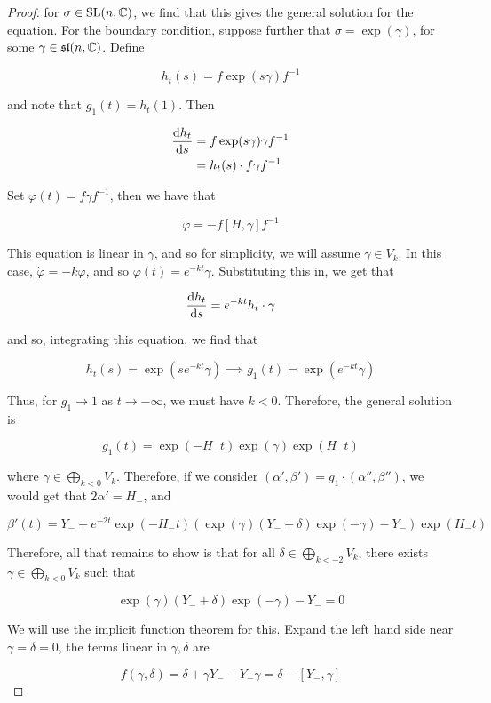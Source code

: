 \documentclass{article}
\renewcommand{\sl}{\mathfrak{sl}}
\begin{document}
\begin{proof}
    for \(\sigma \in \operatorname{SL}(n, \mathbb{C})\), we find that this gives the general solution for the equation. For the boundary condition, suppose further that \(\sigma = \exp(\gamma)\), for some \(\gamma \in \sl(n, \C)\). Define

    \[h_t(s) = f\exp(s\gamma)f^{-1}\]

    and note that \(g_1(t) = h_t(1)\). Then

    \begin{align*}
        \dv{h_t}{s}(s) &= f \exp(s\gamma)\gamma f^{-1} \\
        &= h_t(s) \cdot f \gamma f^{-1}
    \end{align*}

    Set \(\varphi(t) = f\gamma f^{-1}\), then we have that

    \[\dot\varphi = -f[H, \gamma]f^{-1}\]

    This equation is linear in \(\gamma\), and so for simplicity, we will assume \(\gamma \in V_k\). In this case, \(\dot\varphi = -k\varphi\), and so \(\varphi(t) = e^{-kt}\gamma\). Substituting this in, we get that

    \[\dv{h_t}{s} = e^{-kt}h_t \cdot \gamma\]

    and so, integrating this equation, we find that

    \[h_t(s) = \exp(se^{-kt}\gamma) \implies g_1(t) = \exp(e^{-kt}\gamma)\]

    Thus, for \(g_1 \to 1\) as \(t \to -\infty\), we must have \(k < 0\). Therefore, the general solution is

    \[g_1(t) = \exp(-H_-t)\exp(\gamma)\exp(H_-t)\]

    where \(\gamma \in \bigoplus\limits_{k < 0}V_k\). Therefore, if we consider \((\alpha', \beta') = g_1 \cdot (\alpha'', \beta'')\), we would get that \(2\alpha' = H_-\), and

    \[\beta'(t) = Y_- + e^{-2t}\exp(-H_-t)(\exp(\gamma)(Y_- + \delta)\exp(-\gamma) - Y_-)\exp(H_-t)\]

    Therefore, all that remains to show is that for all \(\delta \in \bigoplus\limits_{k < -2}V_k\), there exists \(\gamma \in \bigoplus\limits_{k < 0}V_k\) such that

    \[\exp(\gamma)(Y_- + \delta)\exp(-\gamma) - Y_- = 0\]

    We will use the implicit function theorem for this. Expand the left hand side near \(\gamma = \delta = 0\), the terms linear in \(\gamma, \delta\) are

    \[f(\gamma, \delta) = \delta + \gamma Y_- - Y_-\gamma = \delta - [Y_-, \gamma]\]


\end{proof}
\end{document}
